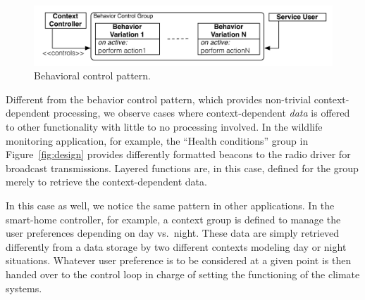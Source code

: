 \begin{figure}[tb]
\begin{center}
\includegraphics[scale=.5]{imgs/beh_var}
\vspace{-6mm}
\caption{Behavioral control pattern.}
  \label{fig:control}
\vspace{-10mm}
\end{center}
\end{figure}




 Different from the behavior control
pattern, which provides non-trivial context-dependent processing, we
observe cases where context-dependent \emph{data} is offered to other
functionality with little to no processing involved. In the wildlife
monitoring application, for example, the ``Health conditions'' group
in Figure~\ref{fig:design} provides differently formatted beacons to
the radio driver for broadcast transmissions. Layered functions are,
in this case, defined for the group merely to retrieve the
context-dependent data.

In this case as well, we notice the same pattern in other
applications. In the smart-home controller, for example, a context
group is defined to manage the user preferences depending on day vs.\
night. These data are simply retrieved differently from a data
storage by two different contexts modeling day or night
situations. Whatever user preference is to be considered at a given
point is then handed over to the control loop in charge of setting the
functioning of the climate systems.

